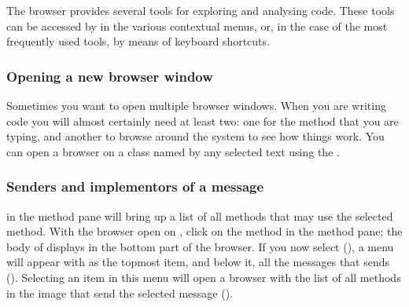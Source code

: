 \documentclass[a4paper,10pt,twoside]{book}
\begin{document}
The browser provides several tools for exploring and analysing code.
These tools can be accessed by  in the various contextual menus, or, in the case of the most frequently used tools, by means of keyboard shortcuts.

\subsubsection{Opening a new browser window}

Sometimes you want to open multiple browser windows.
When you are writing code you will almost certainly need at least two: one for the method that you are typing, and another to browse around the system to see how things work.
You can open a browser on a class named by any selected text using the  . 


\subsubsection{Senders and implementors of a message}

  in the method pane will bring up a list of all methods that may use the selected method. With the browser open on , click on the  method in the method pane; the body of  displays in the bottom part of the browser. If you now select  (), a menu will appear with  as the topmost item, and below it, all the messages that  sends ().  Selecting an item in this menu will open a browser with the list of all methods in the image that send the selected message ().

\end{document}
